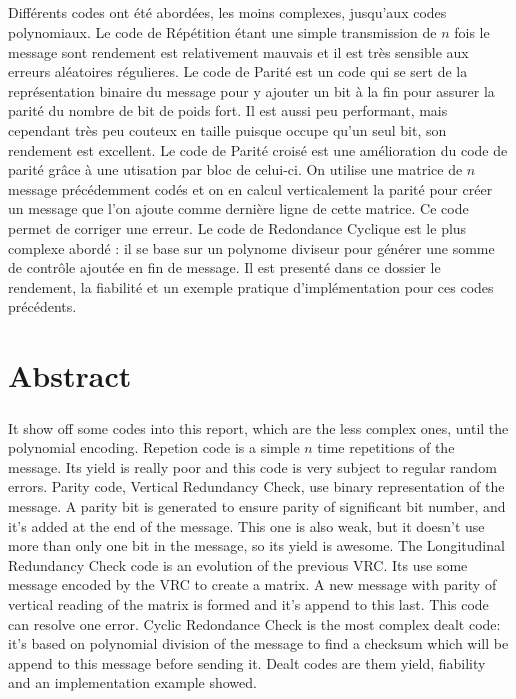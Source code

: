 \documentclass[a4paper,11pt]{report}
\begin{document}
\paragraph{}
Différents codes ont été abordées, les moins complexes, jusqu'aux codes polynomiaux.
Le code de Répétition étant une simple transmission de $n$ fois le message sont rendement est relativement mauvais et il est très sensible aux erreurs  aléatoires régulieres.
Le code de Parité est un code qui se sert de la représentation binaire du message pour y ajouter un bit à la fin pour assurer la parité du nombre de bit de poids fort.
Il est aussi peu performant, mais cependant très peu couteux en taille puisque occupe qu'un seul bit, son rendement est excellent.
Le code de Parité croisé est une amélioration du code de parité grâce à une utisation par bloc de celui-ci. On utilise une matrice de $n$ message précédemment codés et on en calcul verticalement la parité pour créer un message que l'on ajoute comme dernière ligne de cette matrice.
Ce code permet de corriger une erreur.
Le code de Redondance Cyclique est le plus complexe abordé : il se base sur un polynome diviseur pour générer une somme de contrôle ajoutée en fin de message.
Il est presenté dans ce dossier le rendement, la fiabilité et un exemple pratique d'implémentation pour ces codes précédents.
    \clearpage

\chapter*{Abstract}
\paragraph{}
It show off some codes into this report, which are the less complex ones, until the polynomial encoding.
Repetion code is a simple $n$ time repetitions of the message. Its yield is really poor and this code is very subject to regular random errors.
Parity code, Vertical Redundancy Check, use binary representation of the message. A parity bit is generated to ensure parity of significant bit number, and it's added at the end of the message.
This one is also weak, but it doesn't use more than only one bit in the message, so its yield is awesome.
The Longitudinal Redundancy Check code is an evolution of the previous VRC. Its use some message encoded by the VRC to create a matrix. A new message with parity of vertical reading of the matrix is formed and it's append to this last.
This code can resolve one error.
Cyclic Redondance Check is the most complex dealt code: it's based on polynomial division of the message to find a checksum which will be append to this message before sending it.
Dealt codes are them yield, fiability and an implementation example showed.
    \clearpage

    
    \clearpage

    \clearpage
\end{document}
